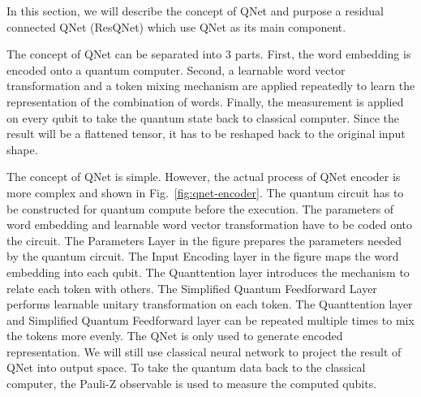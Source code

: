 In this section, we will describe the concept of QNet and purpose a residual connected QNet (ResQNet) which use QNet as its main component.

The concept of QNet can be separated into 3 parts. First, the word embedding is encoded onto a quantum computer. Second, a learnable word vector transformation and a token mixing mechanism are applied repeatedly to learn the representation of the combination of words. Finally, the measurement is applied on every qubit to take the quantum state back to classical computer. Since the result will be a flattened tensor, it has to be reshaped back to the original input shape.

The concept of QNet is simple. However, the actual process of QNet encoder is more complex and shown in Fig.~\ref{fig:qnet-encoder}. The quantum circuit has to be constructed for quantum compute before the execution. The parameters of word embedding and learnable word vector transformation have to be coded onto the circuit. The Parameters Layer in the figure prepares the parameters needed by the quantum circuit. The Input Encoding layer in the figure maps the word embedding into each qubit. The Quanttention layer introduces the mechanism to relate each token with others. The Simplified Quantum Feedforward Layer performs learnable unitary transformation on each token. The Quanttention layer and Simplified Quantum Feedforward layer can be repeated multiple times to mix the tokens more evenly. The QNet is only used to generate encoded representation. We will still use classical neural network to project the result of QNet into output space. To take the quantum data back to the classical computer, the Pauli-Z observable is used to measure the computed qubits.

